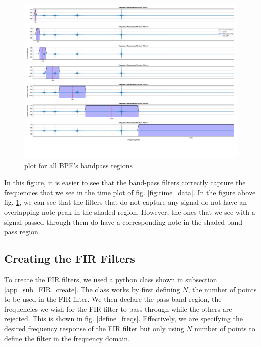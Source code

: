 \documentclass[a4paper, 11pt]{exam}
\begin{document}
\begin{figure}[h!]
  \centering
  \hspace*{-1.5cm}\includegraphics[width=15cm]{../images/post_lock_fft_freqdata.png}
  \caption{plot for all BPF's bandpass regions}
  \label{fig:bandpass_regions}
\end{figure}
In this figure, it is easier to see that the band-pass filters correctly capture the frequencies that we see in the time plot of fig. \ref{fig:time_data}. In the figure above fig. \ref{fig:bandpass_regions}, we can see that the filters that do not capture any signal do not have an overlapping note peak in the shaded region. However, the ones that we see with a signal passed through them do have a corresponding note in the shaded band-pass region. 

\subsection{Creating the FIR Filters}
To create the FIR filters, we used a python class shown in subsection \ref{app_sub_FIR_create}. The class works by first defining $N$, the number of points to be used in the FIR filter. We then declare the pass band region, the frequencies we wish for the FIR filter to pass through while the others are rejected. This is shown in fig. \ref{define_freqs}. Effectively, we are specifying the desired frequency response of the FIR filter but only using $N$ number of points to define the filter in the frequency domain.
\end{document}

